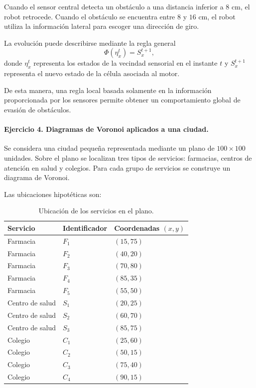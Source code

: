 \documentclass[14pt,twoside]{article}
\begin{document}
Cuando el sensor central detecta un obstáculo a una distancia inferior a $8$ cm, el
robot retrocede. Cuando el obstáculo se encuentra entre $8$ y $16$ cm, el robot utiliza
la información lateral para escoger una dirección de giro.

La evolución puede describirse mediante la regla general
\[
\Phi(\eta_x^t)=S_x^{t+1},
\]
donde $\eta_x^t$ representa los estados de la vecindad sensorial en el instante $t$
y $S_x^{t+1}$ representa el nuevo estado de la célula asociada al motor.

De esta manera, una regla local basada solamente en la información proporcionada por
los sensores permite obtener un comportamiento global de evasión de obstáculos.

\paragraph{Ejercicio 4. Diagramas de Voronoi aplicados a una ciudad.}

Se considera una ciudad pequeña representada mediante un plano de $100\times100$
unidades. Sobre el plano se localizan tres tipos de servicios: farmacias, centros de
atención en salud y colegios. Para cada grupo de servicios se construye un diagrama de
Voronoi.

Las ubicaciones hipotéticas son:

\begin{table}[H]
\centering
\caption{Ubicación de los servicios en el plano.}
\begin{tabularx}{0.85\textwidth}{>{\centering\arraybackslash}m{}>{\centering\arraybackslash}m{}>{\centering\arraybackslash}X}
\toprule
Servicio & Identificador & Coordenadas $(x,y)$ \\
\midrule
Farmacia & $F_1$ & $(15,75)$ \\
Farmacia & $F_2$ & $(40,20)$ \\
Farmacia & $F_3$ & $(70,80)$ \\
Farmacia & $F_4$ & $(85,35)$ \\
Farmacia & $F_5$ & $(55,50)$ \\
Centro de salud & $S_1$ & $(20,25)$ \\
Centro de salud & $S_2$ & $(60,70)$ \\
Centro de salud & $S_3$ & $(85,75)$ \\
Colegio & $C_1$ & $(25,60)$ \\
Colegio & $C_2$ & $(50,15)$ \\
Colegio & $C_3$ & $(75,40)$ \\
Colegio & $C_4$ & $(90,15)$ \\
\bottomrule
\end{tabularx}
\end{table}
\end{document}
